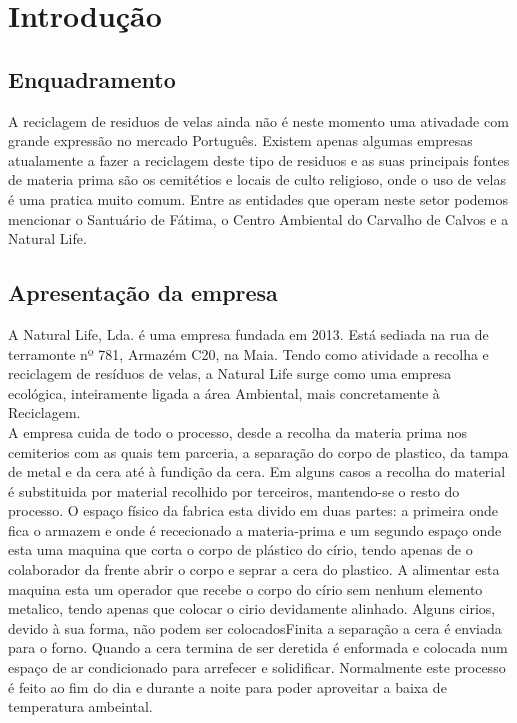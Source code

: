 \chapter{Introdução}
\label{cap:1}

\section{Enquadramento}
A reciclagem de residuos de velas ainda não é neste momento uma ativadade com grande expressão no mercado Português. Existem apenas algumas empresas atualamente a fazer a reciclagem deste tipo de residuos e as suas principais fontes de materia prima são os cemitétios e locais de culto religioso, onde o uso de velas é uma pratica muito comum. Entre as entidades que operam neste setor podemos mencionar o Santuário de Fátima\cite{DesktakFatima}, o Centro Ambiental do Carvalho de Calvos\cite{SecundinoCunha2016} e a Natural Life\cite{NaturalLife}.

\section{Apresentação da empresa}
A Natural Life, Lda. é uma empresa fundada em 2013. Está sediada na rua de terramonte nº 781, Armazém C20, na Maia. Tendo como atividade a recolha e reciclagem de resíduos de velas, a Natural Life surge como uma empresa ecológica, inteiramente ligada a área Ambiental, mais concretamente à Reciclagem.\cite{NaturalLife}\\
A empresa cuida de todo o processo, desde a recolha da materia prima nos cemiterios com as quais tem parceria, a separação do corpo de plastico, da tampa de metal e da cera até à fundição da cera. Em alguns casos a recolha do material é substituida por material recolhido por terceiros, mantendo-se o resto do processo.
O espaço físico da fabrica esta divido em duas partes: a primeira onde fica o armazem e onde é rececionado a materia-prima e um segundo espaço onde esta uma maquina que corta o corpo de plástico do círio, tendo apenas de o colaborador da frente abrir o corpo e seprar a cera do plastico. A alimentar esta maquina esta um operador que recebe o corpo do círio sem nenhum elemento metalico, tendo apenas que colocar o cirio devidamente alinhado. Alguns cirios, devido à sua forma, não podem ser colocadosFinita a separação a cera é enviada para o forno. Quando a cera termina de ser deretida é enformada e colocada num espaço de ar condicionado para arrefecer e solidificar. Normalmente este processo é feito ao fim do dia e durante a noite para poder aproveitar a baixa de temperatura ambeintal.

